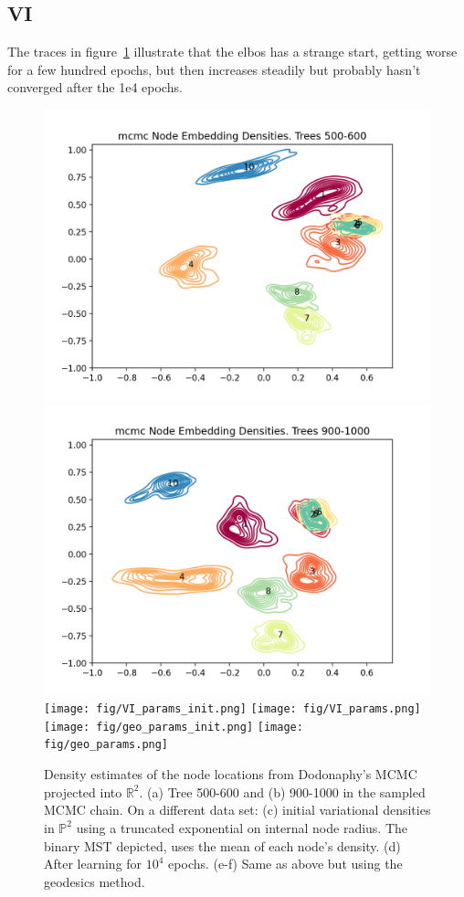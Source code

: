 \documentclass[11pt]{article}
\begin{document}
\subsection{VI}
The traces in figure~\ref{fig:elbos} illustrate that the elbos has a strange start, getting worse for a few hundred epochs, but then increases steadily but probably hasn’t converged after the 1e4 epochs.
\begin{figure}[htbp]
\begin{center}
\includegraphics[width=.5\linewidth]{fig/locations_500.png}%
\includegraphics[width=.5\linewidth]{fig/locations_900.png}
\texttt{[image: fig/VI\_params\_init.png]}%
\texttt{[image: fig/VI\_params.png]}
\texttt{[image: fig/geo\_params\_init.png]}%
\texttt{[image: fig/geo\_params.png]}
\caption{Density estimates of the node locations from Dodonaphy's MCMC projected into $\mathbb{R}^{2}$. (a) Tree 500-600 and (b) 900-1000 in the sampled MCMC chain. On a different data set: (c) initial variational densities in $\mathbb{P}^{2}$ using a truncated exponential on internal node radius. The binary MST depicted, uses the mean of each node's density. (d) After learning for $10^{4}$ epochs. (e-f) Same as above but using the geodesics method.}
\label{fig:elbos}
\end{center}
\end{figure}
\end{document}
